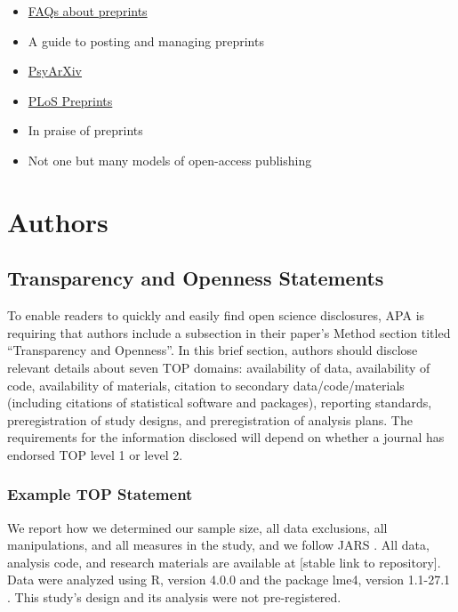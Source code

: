 \documentclass[
  oneside]{book}
\providecommand{\tightlist}{%
  \setlength{\itemsep}{0pt}\setlength{\parskip}{0pt}}
\begin{document}
\begin{itemize}
\tightlist
\item
  \href{http://blog.psyarxiv.com/2016/09/19/psyarxiv-faq/}{FAQs about preprints}
\item
  A guide to posting and managing preprints \citep{moshontz2021guide}
\item
  \href{https://psyarxiv.com/}{PsyArXiv}
\item
  \href{https://plos.org/open-science/preprints/}{PLoS Preprints}
\item
  In praise of preprints \citep{fry2019praise}
\item
  Not one but many models of open-access publishing \citep{condon2020not}
\end{itemize}

\hypertarget{part-authors}{%
\part{Authors}\label{part-authors}}

\hypertarget{authors-top}{%
\chapter{Transparency and Openness Statements}\label{authors-top}}

To enable readers to quickly and easily find open science disclosures, APA is requiring that authors include a subsection in their paper's Method section titled ``Transparency and Openness''. In this brief section, authors should disclose relevant details about seven TOP domains: availability of data, availability of code, availability of materials, citation to secondary data/code/materials (including citations of statistical software and packages), reporting standards, preregistration of study designs, and preregistration of analysis plans. The requirements for the information disclosed will depend on whether a journal has endorsed TOP level 1 or level 2.

\hypertarget{example-top-statement-1}{%
\section{Example TOP Statement}\label{example-top-statement-1}}

We report how we determined our sample size, all data exclusions, all manipulations, and all measures in the study, and we follow JARS \citep{kazak2018journal}. All data, analysis code, and research materials are available at {[}stable link to repository{]}. Data were analyzed using R, version 4.0.0 \citep{R} and the package lme4, version 1.1-27.1 \citep{lme4}. This study's design and its analysis were not pre-registered.
\end{document}
